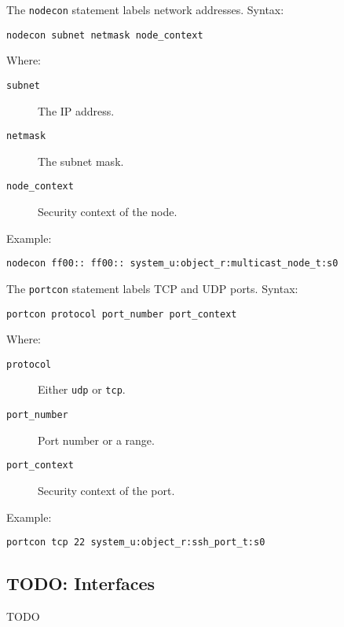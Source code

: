 The \texttt{nodecon} statement labels network addresses. Syntax:
\begin{lstlisting}
nodecon subnet netmask node_context
\end{lstlisting}
Where:
\begin{description}
    \item [\texttt{subnet}] The IP address.
    \item [\texttt{netmask}] The subnet mask.
    \item [\texttt{node\_context}] Security context of the node.
\end{description}
Example:
\begin{lstlisting}
nodecon ff00:: ff00:: system_u:object_r:multicast_node_t:s0
\end{lstlisting}

The \texttt{portcon} statement labels TCP and UDP ports. Syntax:
\begin{lstlisting}
portcon protocol port_number port_context
\end{lstlisting}
Where:
\begin{description}
    \item [\texttt{protocol}] Either \texttt{udp} or \texttt{tcp}.
    \item [\texttt{port\_number}] Port number or a range.
    \item [\texttt{port\_context}] Security context of the port.
\end{description}
Example:
\begin{lstlisting}
portcon tcp 22 system_u:object_r:ssh_port_t:s0
\end{lstlisting}

\subsection{TODO: Interfaces}
\label{interfaces}
TODO


